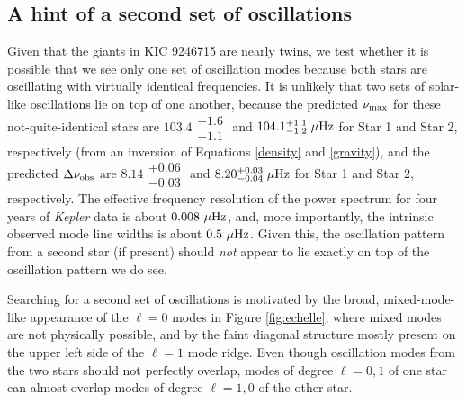 \subsection{A hint of a second set of oscillations}
\label{subsec_second_osc}
Given that the giants in KIC 9246715 are nearly twins, we test whether it is possible that we see only one set of oscillation modes because both stars are oscillating with virtually identical frequencies. It is unlikely that two sets of solar-like oscillations lie on top of one another, because the predicted $\nu_{\rm{max}}$ for these not-quite-identical stars are
$103.4\substack{+1.6 \\ -1.1}$ and $104.1\substack{+1.1 \\ -1.2} \ \mu\rm{Hz}$ 
for Star 1 and Star 2, respectively (from an inversion of Equations \ref{density} and \ref{gravity}), and the predicted $\Delta\nu_{\rm{obs}}$ are 
$8.14\substack{+0.06 \\ -0.03}$ and $8.20\substack{+0.03 \\ -0.04} \ \mu\rm{Hz}$ 
for Star 1 and Star 2, respectively. The effective frequency resolution of the power spectrum for four years of \emph{Kepler} data is about $0.008 \ \mu \rm{Hz}$, and, more importantly, the intrinsic observed mode line widths is about $0.5 \ \mu \rm{Hz}$. Given this, the oscillation pattern from a second star (if present) should \emph{not} appear to lie exactly on top of the oscillation pattern we do see.

Searching for a second set of oscillations is motivated by the broad, mixed-mode-like appearance of the $\ell=0$ modes in Figure \ref{fig:echelle}, where mixed modes are not physically possible, and by the faint diagonal structure mostly present on the upper left side of the $\ell=1$ mode ridge. Even though oscillation modes from the two stars should not perfectly overlap, modes of degree $\ell=0,1$ of one star can almost overlap modes of degree $\ell=1,0$ of the other star.


